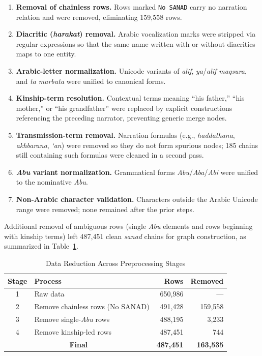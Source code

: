 \documentclass[conference]{IEEEtran}
\begin{document}
\begin{enumerate}
\item \textbf{Removal of chainless rows.} Rows marked \texttt{No SANAD} carry no
narration relation and were removed, eliminating 159{,}558 rows.
\item \textbf{Diacritic (\textit{harakat}) removal.} Arabic vocalization marks
were stripped via regular expressions so that the same name written with or
without diacritics maps to one entity.
\item \textbf{Arabic-letter normalization.} Unicode variants of \textit{alif},
\textit{ya}/\textit{alif maqsura}, and \textit{ta marbuta} were unified to
canonical forms.
\item \textbf{Kinship-term resolution.} Contextual terms meaning ``his father,''
``his mother,'' or ``his grandfather'' were replaced by explicit constructions
referencing the preceding narrator, preventing generic merge nodes.
\item \textbf{Transmission-term removal.} Narration formulas (e.g.,
\textit{haddathana}, \textit{akhbarana}, \textit{`an}) were removed so they do
not form spurious nodes; 185 chains still containing such formulas were cleaned
in a second pass.
\item \textbf{\textit{Abu} variant normalization.} Grammatical forms
\textit{Abu}/\textit{Aba}/\textit{Abi} were unified to the nominative
\textit{Abu}.
\item \textbf{Non-Arabic character validation.} Characters outside the Arabic
Unicode range were removed; none remained after the prior steps.
\end{enumerate}

Additional removal of ambiguous rows (single \textit{Abu} elements and rows
beginning with kinship terms) left 487{,}451 clean \textit{sanad} chains for
graph construction, as summarized in Table~\ref{tab:reduksi}.

\begin{table}[!t]
\caption{Data Reduction Across Preprocessing Stages}
\label{tab:reduksi}
\centering
\renewcommand{\arraystretch}{1.3}
\begin{tabular}{clrr}
\toprule
Stage & Process & Rows & Removed \\
\midrule
1 & Raw data                          & 650{,}986 & --- \\
2 & Remove chainless rows (No SANAD)  & 491{,}428 & 159{,}558 \\
3 & Remove single-\textit{Abu} rows   & 488{,}195 & 3{,}233 \\
4 & Remove kinship-led rows           & 487{,}451 & 744 \\
\midrule
\multicolumn{2}{c}{\textbf{Final}}    & \textbf{487{,}451} & \textbf{163{,}535} \\
\bottomrule
\end{tabular}
\end{table}
\end{document}
